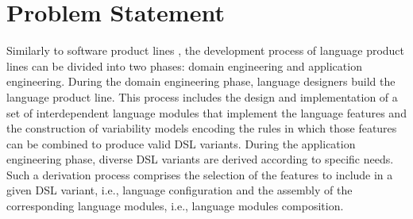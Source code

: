 \section{Problem Statement}
\label{sec:problemstatement}


\label{sec:thedevelopmentscenario}

Similarly to software product lines \cite{Linden:2007}, the development process of language product lines can be divided into two phases: domain engineering and application engineering. During the domain engineering phase, language designers build the language product line. This process includes the design and implementation of a set of interdependent language modules that implement the language features and the construction of variability models encoding the rules in which those features can be combined to produce valid DSL variants. During the application engineering phase, diverse DSL variants are derived according to specific needs. Such a derivation process comprises the selection of the features to include in a given DSL variant, i.e., language configuration and the assembly of the corresponding language modules, i.e., language modules composition.


